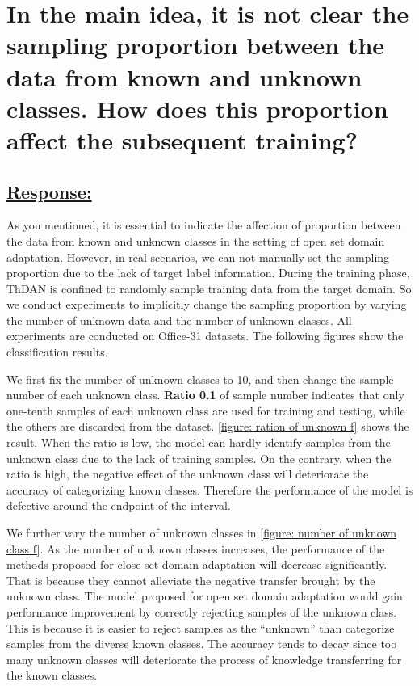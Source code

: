 \section*{In the main idea, it is not clear the sampling proportion between the data from known and unknown classes. How does this proportion affect the subsequent training?}
\subsection*{\underline{\textbf{Response:}}}

As you mentioned, it is essential to indicate the affection of proportion between the data from known and unknown classes in the setting of open set domain adaptation.
However, in real scenarios, we can not manually set the sampling proportion due to the lack of target label information.
During the training phase, ThDAN is confined to randomly sample training data from the target domain.
So we conduct experiments to implicitly change the sampling proportion by varying the number of unknown data and the number of unknown classes.
All experiments are conducted on Office-31 datasets.
The following figures show the classification results.



We first fix the number of unknown classes to 10, and then change the sample number of each unknown class.
\textbf{Ratio 0.1} of sample number indicates that only one-tenth samples of each unknown class are used for training and testing, while the others are discarded from the dataset.
\figurename{\ref{figure: ration of unknown f}} shows the result.
When the ratio is low, the model can hardly identify samples from the unknown class due to the lack of training samples.
On the contrary, when the ratio is high, the negative effect of the unknown class will deteriorate the accuracy of categorizing known classes. 
Therefore the performance of the model is defective around the endpoint of the interval.

We further vary the number of unknown classes in \figurename{\ref{figure: number of unknown class f}}.
As the number of unknown classes increases, the performance of the methods proposed for close set domain adaptation will decrease significantly.
That is because they cannot alleviate the negative transfer brought by the unknown class.
The model proposed for open set domain adaptation would gain performance improvement by correctly rejecting samples of the unknown class.
This is because it is easier to reject samples as the ``unknown'' than categorize samples from the diverse known classes.
The accuracy tends to decay since too many unknown classes will deteriorate the process of knowledge transferring for the known classes.

